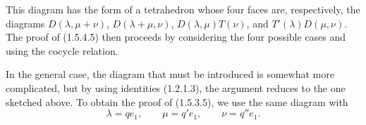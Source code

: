 This diagram has the form of a tetrahedron whose four faces are,
respectively, the diagrams $D(\lambda,\mu+\nu)$,
$D(\lambda+\mu,\nu)$, $D(\lambda,\mu)T(\nu)$, and
$T'(\lambda)D(\mu,\nu)$. The proof of (1.5.4.5) then proceeds by
considering the four possible cases and using the cocycle relation.

In the general case, the diagram that must be introduced is somewhat
more complicated, but by using identities (1.2.1.3), the argument
reduces to the one sketched above. To obtain the proof of (1.5.3.5),
we use the same diagram with
\[
  \lambda=qe_1,\qquad \mu=q'e_1,\qquad \nu=q''e_1.
\]
